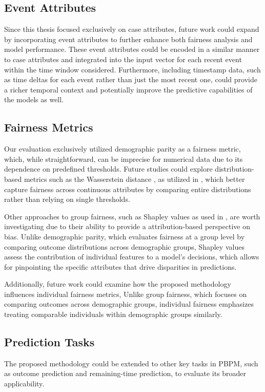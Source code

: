 \subsection*{Event Attributes}
Since this thesis focused exclusively on case attributes,
future work could expand by incorporating event attributes to further enhance both fairness analysis and model performance.
These event attributes could be encoded in a similar manner to case attributes
and integrated into the input vector for each recent event within the time window considered.
Furthermore, including timestamp data, such as time deltas for each event rather than just the most recent one,
could provide a richer temporal context and potentially improve the predictive capabilities of the models as well.

\subsection*{Fairness Metrics}
Our evaluation exclusively utilized demographic parity as a fairness metric, which, while straightforward,
can be imprecise for numerical data due to its dependence on predefined thresholds.
Future studies could explore distribution-based metrics such as the Wasserstein distance \cite{wasserstein},
as utilized in \cite{fairness_independence}, which better capture fairness across continuous attributes
by comparing entire distributions rather than relying on single thresholds.

Other approaches to group fairness, such as Shapley values \cite{shapley} as used in \cite{fairness_adversarial},
are worth investigating due to their ability to provide a attribution-based perspective on bias.
Unlike demographic parity, which evaluates fairness at a group level by comparing outcome distributions across demographic groups,
Shapley values assess the contribution of individual features to a model's decisions,
which allows for pinpointing the specific attributes that drive disparities in predictions.

Additionally, future work could examine how the proposed methodology influences individual fairness metrics,
Unlike group fairness, which focuses on comparing outcomes across demographic groups,
individual fairness emphasizes treating comparable individuals within demographic groups similarly.

\subsection*{Prediction Tasks}
The proposed methodology could be extended to other key tasks in PBPM,
such as outcome prediction and remaining-time prediction, to evaluate its broader applicability.

